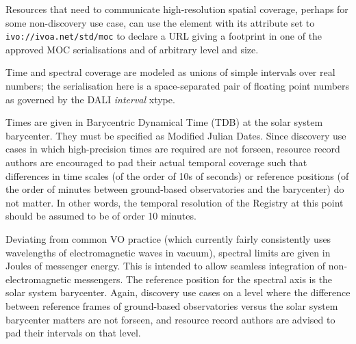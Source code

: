 \documentclass[11pt,a4paper]{ivoa}
\begin{document}
Resources that need to communicate high-resolution spatial coverage,
perhaps for some non-discovery use case, can use the 
element with its  attribute set to
\nolinkurl{ivo://ivoa.net/std/moc} to declare a URL giving a
footprint in one of the approved MOC serialisations and of arbitrary
level and size.

Time and spectral coverage are modeled as unions of simple
intervals over real numbers; the serialisation here is a space-separated
pair of floating point numbers as governed by the DALI \emph{interval}
xtype.

Times are given in Barycentric Dynamical Time (TDB) at the solar system
barycenter.  They must be specified as Modified Julian Dates.  Since
discovery use cases in which high-precision times are required are not
forseen, resource record authors are encouraged to pad their actual
temporal coverage such that differences in time scales (of the order of
10s of seconds) or reference positions (of the order of minutes between
ground-based observatories and the barycenter) do not matter.  In other
words, the temporal resolution of the Registry at this point should be
assumed to be of order 10 minutes.

Deviating from common VO practice (which currently fairly consistently
uses wavelengths of electromagnetic waves in vacuum), spectral limits are
given in Joules of messenger energy.  This is intended to allow seamless
integration of non-elec\-tromagnetic messengers.  The reference position
for the spectral axis is the solar system barycenter.  Again, discovery
use cases on a level where the difference between reference frames of
ground-based observatories versus the solar system barycenter matters
are not forseen, and resource record authors are advised to pad their
intervals on that level.
\end{document}
